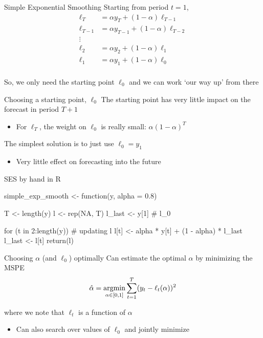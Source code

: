 \documentclass[aspectratio=169,t,11pt,table]{beamer}
\begin{document}
\begin{frame}{Simple Exponential Smoothing}
  Starting from period $t = 1$, 
  \begin{align*}
    \ell_{T} &= \alpha y_T + (1-\alpha) \ell_{T-1} \\
    \ell_{T-1} &= \alpha y_{T-1} + (1-\alpha) \ell_{T-2} \\
    \vdots \\
    \ell_{2} &= \alpha y_2 + (1-\alpha) \ell_{1} \\
    \ell_{1} &= \alpha y_1 + (1-\alpha) \ell_{0} \\
  \end{align*}

  \vspace*{-\bigskipamount}
  So, we only need the starting point $\ell_0$ and we can work `our way up' from there
\end{frame}

\begin{frame}{Choosing a starting point, $\ell_0$}
  The starting point has very little impact on the forecast in period $T + 1$
  \begin{itemize}
    \item For $\ell_T$, the weight on $\ell_0$ is really small: $\alpha (1 - \alpha)^T$
  \end{itemize}
  
  \bigskip
  The simplest solution is to just use $\ell_0 = y_1$ 
  \begin{itemize}
    \item Very little effect on forecasting into the future
  \end{itemize}
\end{frame}


\begin{frame}[fragile]{SES by hand in R}
  \vspace*{-\bigskipamount}
  \begin{codeblock}
simple_exp_smooth <- function(y, alpha = 0.8) {
  T <- length(y)
  l <- rep(NA, T)
  l_last <- y[1] # l_0

  for (t in 2:length(y)) { # updating l
    l[t] <- alpha * y[t] + (1 - alpha) * l_last
    l_last <- l[t]
  }
  return(l)
}
  \end{codeblock}
\end{frame}

\begin{frame}{Choosing $\alpha$ (and $\ell_0$) optimally}
  Can estimate the optimal $\alpha$ by minimizing the MSPE
  \smallskip
  $$
    \hat{\alpha} = \operatorname*{argmin}_{\alpha \in [0, 1]} \sum_{t = 1}^T (y_t - \ell_t(\alpha))^2
  $$

  \bigskip
  where we note that $\ell_t$ is a function of $\alpha$ 
  \begin{itemize}
    \item Can also search over values of $\ell_0$ and jointly minimize
  \end{itemize}
\end{frame}
\end{document}
